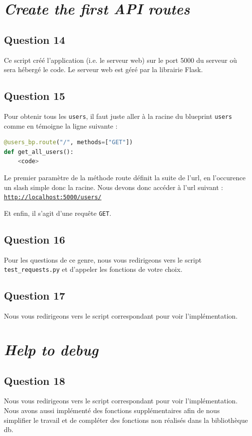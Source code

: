 \documentclass{ceri/sty/rapport}
\begin{document}
\section{\textit{Create the first API routes}}
\subsection{Question 14}
Ce script créé l'application (i.e. le serveur web) sur le port 5000 du serveur où sera hébergé le code. Le serveur web est géré par la librairie Flask.

\subsection{Question 15}
Pour obtenir tous les \texttt{users}, il faut juste aller à la racine du blueprint \texttt{users} comme en témoigne la ligne suivante :

\begin{lstlisting}[language=python]
@users_bp.route("/", methods=["GET"])
def get_all_users():
    <code>
\end{lstlisting}

Le premier paramètre de la méthode route définit la suite de l'url, en l'occurence un slash simple donc la racine. Nous devons donc accéder à l'url suivant : \texttt{\url{http://localhost:5000/users/}}

Et enfin, il s'agit d'une requête \texttt{GET}.

\subsection{Question 16}
Pour les questions de ce genre, nous vous redirigeons vers le script \texttt{test\_requests.py} et d'appeler les fonctions de votre choix.

\subsection{Question 17}
Nous vous redirigeons vers le script correspondant pour voir l'implémentation.

\section{\textit{Help to debug}}
\subsection{Question 18}
Nous vous redirigeons vers le script correspondant pour voir l'implémentation.
Nous avons aussi implémenté des fonctions supplémentaires afin de nous simplifier le travail et de compléter des fonctions non réalisés dans la bibliothèque db.
\end{document}
